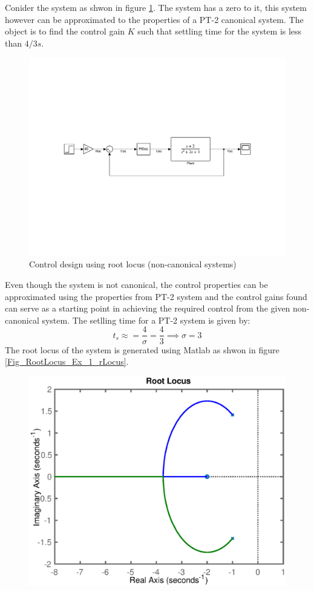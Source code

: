 Conider the system as shwon in figure \ref{Fig_RootLocus_Ex_1}. The system has a zero to it, this system however can be approximated to the properties of a PT-2 canonical system. The object is to find the control gain $K$ such that settling time for the system is less than $4/3$$s$.
\begin{figure}[h!]
	\centering
	\includegraphics[width=\linewidth]{Bilder/RootLocus_Ex_1.pdf}
	\caption{Control design using root locus (non-canonical systems)}
	\label{Fig_RootLocus_Ex_1}
\end{figure}
Even though the system is not canonical, the control properties can be approximated using the properties from PT-2 system and the control gains found can serve as a starting point in achieving the required control from the given non-canonical system. The setlling time for a PT-2 system is given by:
\begin{equation} \label{Eq_RootLocus_Ex_1_ts}
	t_s \approx = \frac{4}{\sigma} = \frac{4}{3} \implies \sigma = 3
\end{equation}
The root locus of the system is generated using Matlab as shwon in figure \ref{Fig_RootLocus_Ex_1_rLocus}.
\begin{figure}[h!]
	\centering
	\includegraphics[width=0.7\linewidth]{Bilder/RootLocus_Ex_1_rLocus.eps}

\end{figure}$$

